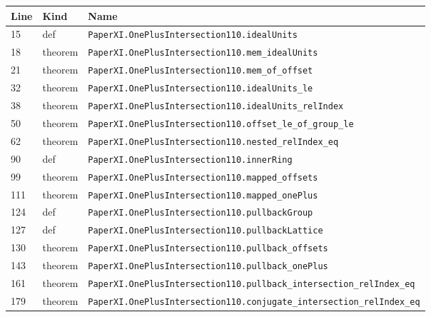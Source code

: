 \documentclass[10pt,oneside]{book}
\begin{document}
\begin{longtable}{@{}p{}p{}p{}@{}}\toprule Line&Kind&Name\\\midrule\endhead

15&def&\nolinkurl{PaperXI.OnePlusIntersection110.idealUnits}\\

18&theorem&\nolinkurl{PaperXI.OnePlusIntersection110.mem_idealUnits}\\

21&theorem&\nolinkurl{PaperXI.OnePlusIntersection110.mem_of_offset}\\

32&theorem&\nolinkurl{PaperXI.OnePlusIntersection110.idealUnits_le}\\

38&theorem&\nolinkurl{PaperXI.OnePlusIntersection110.idealUnits_relIndex}\\

50&theorem&\nolinkurl{PaperXI.OnePlusIntersection110.offset_le_of_group_le}\\

62&theorem&\nolinkurl{PaperXI.OnePlusIntersection110.nested_relIndex_eq}\\

90&def&\nolinkurl{PaperXI.OnePlusIntersection110.innerRing}\\

99&theorem&\nolinkurl{PaperXI.OnePlusIntersection110.mapped_offsets}\\

111&theorem&\nolinkurl{PaperXI.OnePlusIntersection110.mapped_onePlus}\\

124&def&\nolinkurl{PaperXI.OnePlusIntersection110.pullbackGroup}\\

127&def&\nolinkurl{PaperXI.OnePlusIntersection110.pullbackLattice}\\

130&theorem&\nolinkurl{PaperXI.OnePlusIntersection110.pullback_offsets}\\

143&theorem&\nolinkurl{PaperXI.OnePlusIntersection110.pullback_onePlus}\\

161&theorem&\nolinkurl{PaperXI.OnePlusIntersection110.pullback_intersection_relIndex_eq}\\

179&theorem&\nolinkurl{PaperXI.OnePlusIntersection110.conjugate_intersection_relIndex_eq}\\

\bottomrule\end{longtable}
\end{document}
